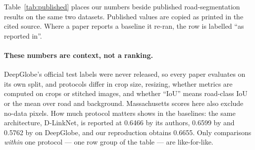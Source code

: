 \documentclass[11pt]{article}
\begin{document}
Table~\ref{tab:published} places our numbers beside published road-segmentation results on the
same two datasets. Published values are copied as printed in the cited source. Where a paper reports
a baseline it re-ran, the row is labelled ``as reported in''.

\paragraph{These numbers are context, not a ranking.} DeepGlobe's official test labels were never
released, so every paper evaluates on its own split, and protocols differ in crop size, resizing,
whether metrics are computed on crops or stitched images, and whether ``IoU'' means road-class IoU
or the mean over road and background. Massachusetts scores here also exclude no-data pixels.
How much protocol matters shows in the baselines: the same architecture, D-LinkNet, is reported at
0.6466 by its authors, 0.6599 by \cite{zhang2026dsfc} and 0.5762 by \cite{tao2023} on DeepGlobe,
and our reproduction obtains 0.6655. Only comparisons \emph{within} one protocol --- one row group of
the table --- are like-for-like.
\end{document}
